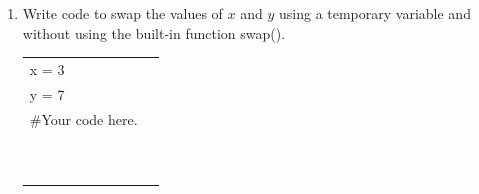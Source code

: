 \documentclass{article}
\begin{document}
\begin{enumerate}
	\item 
		Write code to swap the values of $x$ and $y$ using a temporary variable and without using
		the built-in function swap().\\		
		\begin{tabular}{|ll}
			\\			
			x = 3\\
			y = 7\\[5pt]
			\#Your code here. \\[5pt]
			& \\ & \\ & \\ & \\ & \\ & \\ & \\ & \\ & \\ & \\ 
		\end{tabular}









\end{enumerate}
\end{document}
